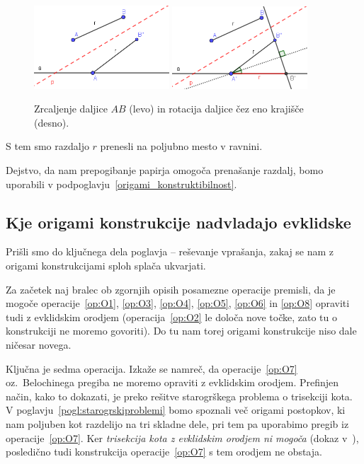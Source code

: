 \begin{dokaz}
    \begin{figure}[h]
        \centering
        \includegraphics[width=0.45\textwidth]{images/zrcaljenje_korak1.png}
        \includegraphics[width=0.45\textwidth]{images/zrcaljenje_korak2.png}
        \caption[Prenašanje razdalj z origamijem po korakih]{Zrcaljenje daljice $AB$ (levo) in rotacija daljice čez eno krajišče (desno).}
        \label{fig:prenos_razdalje_koraki}
    \end{figure}

    S tem smo razdaljo $r$ prenesli na poljubno mesto v ravnini.
\end{dokaz}

Dejstvo, da nam prepogibanje papirja omogoča prenašanje razdalj, bomo uporabili v podpoglavju~\ref{origami_konstruktibilnost}.

\subsection{Kje origami konstrukcije nadvladajo evklidske}

Prišli smo do ključnega dela poglavja -- reševanje vprašanja, zakaj se nam z origami konstrukcijami sploh splača ukvarjati.

Za začetek naj bralec ob zgornjih opisih posamezne operacije premisli, da je mogoče operacije~\ref{op:O1}, \ref{op:O3}, \ref{op:O4}, \ref{op:O5}, \ref{op:O6} in \ref{op:O8} opraviti tudi z evklidskim orodjem (operacija~\ref{op:O2} le določa nove točke, zato tu o konstrukciji ne moremo govoriti). Do tu nam torej origami konstrukcije niso dale ničesar novega.

Ključna je sedma operacija. Izkaže se namreč, da operacije~\ref{op:O7} oz.\ Belochinega pregiba ne moremo opraviti z evklidskim orodjem. Prefinjen način, kako to dokazati, je preko rešitve starogrškega problema o trisekciji kota. V poglavju~\ref{pogl:starogrskiproblemi} bomo spoznali več origami postopkov, ki nam poljuben kot razdelijo na tri skladne dele, pri tem pa uporabimo pregib iz operacije~\ref{op:O7}. Ker \emph{trisekcija kota z evklidskim orodjem ni mogoča} (dokaz v~\cite[str.\ 77--78]{jerman1998}), posledično tudi konstrukcija operacije~\ref{op:O7} s tem orodjem ne obstaja.

